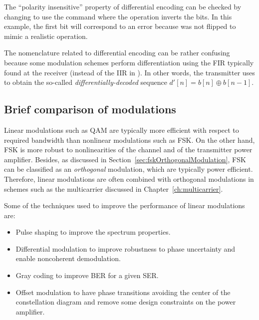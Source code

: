 
The ``polarity insensitive'' property of differential encoding can be checked by changing  to use the command
where the {\aktilde} operation inverts the bits. In this example, the first bit will correspond to an error because  was not flipped to mimic a realistic operation.

The nomenclature related to differential encoding can be rather confusing 
because some modulation schemes perform differentiation using the FIR
typically found at the receiver (instead of the IIR in ).
In other words, the transmitter uses 
to obtain the so-called \emph{differentially-decoded} sequence $d'[n] = b[n] \oplus b[n-1]$.

\subsection{Brief comparison of modulations}

Linear modulations such as QAM are typically more efficient with respect to required bandwidth than nonlinear modulations such as FSK. On the other hand, FSK is more robust to nonlinearities of the channel and of the transmitter power amplifier. Besides, as discussed in Section~\ref{sec:fskOrthogonalModulation}, FSK can be classified as an \emph{orthogonal} modulation, which are typically power efficient.
Therefore, linear modulations are often combined with orthogonal modulations in schemes such as the multicarrier discussed in Chapter~\ref{ch:multicarrier}.

Some of the techniques used to improve the performance of linear modulations are:
\begin{itemize}
	\item Pulse shaping to improve the spectrum properties.
	\item Differential modulation to improve robustness to phase uncertainty and enable noncoherent demodulation.
	\item Gray coding to improve BER for a given SER.
	\item Offset modulation to have phase transitions avoiding the center of the constellation diagram and remove some design constraints on the power amplifier.
\end{itemize}


